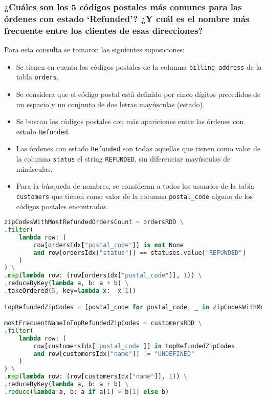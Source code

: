 \subsubsection{¿Cuáles son los 5 códigos postales más comunes para las órdenes con estado `Refunded'? ¿Y cuál es el nombre más frecuente entre los clientes de esas direcciones?}
Para esta consulta se tomaron las siguientes suposiciones:
\begin{itemize}
    \item Se tienen en cuenta los códigos postales de la columna \texttt{billing\_address} de la tabla \texttt{orders}.
    \item Se considera que el código postal está definido por cinco dígitos precedidos de un espacio y un conjunto de dos letras mayúsculas (estado).
    \item Se buscan los códigos postales con más apariciones entre las órdenes con estado \texttt{Refunded}.
    \item Las órdenes con estado \texttt{Refunded} son todas aquellas que tienen como valor de la columna \texttt{status} el string \texttt{REFUNDED}, sin diferenciar mayúsculas de minúsculas.
    \item Para la búsqueda de nombres, se consideran a todos los usuarios de la tabla \texttt{customers} que tienen como valor de la columna \texttt{postal\_code} alguno de los códigos postales encontrados.
\end{itemize}

\begin{lstlisting}[language=Python, caption=Resolución de la consulta 2 propuesta por el enunciado, label={lst:enunciado_q2}, xleftmargin=0pt, xrightmargin=0pt]
zipCodesWithMostRefundedOrdersCount = ordersRDD \
.filter(
    lambda row: (
        row[ordersIdx["postal_code"]] is not None
        and row[ordersIdx["status"]] == statuses.value["REFUNDED"]
    )
) \
.map(lambda row: (row[ordersIdx["postal_code"]], 1)) \
.reduceByKey(lambda a, b: a + b) \
.takeOrdered(5, key=lambda x: -x[1])

topRefundedZipCodes = [postal_code for postal_code, _ in zipCodesWithMostRefundedOrdersCount]

mostFrecuentNameInTopRefundedZipCodes = customersRDD \
.filter(
    lambda row: (
        row[customersIdx["postal_code"]] in topRefundedZipCodes
        and row[customersIdx["name"]] != "UNDEFINED"
    )
) \
.map(lambda row: (row[customersIdx["name"]], 1)) \
.reduceByKey(lambda a, b: a + b) \
.reduce(lambda a, b: a if a[1] > b[1] else b)
\end{lstlisting}

